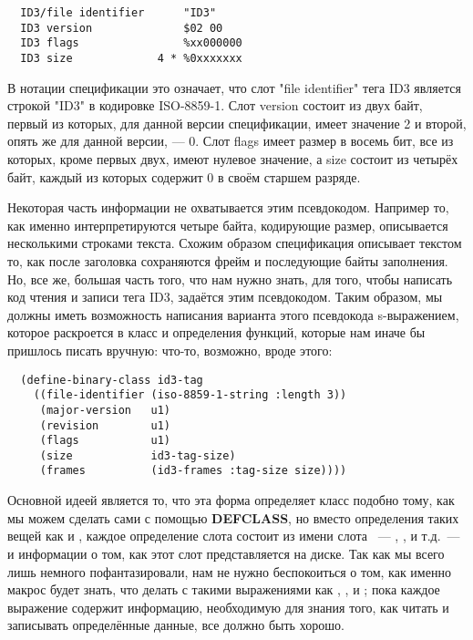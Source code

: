 \begin{verbatim}
  ID3/file identifier      "ID3"
  ID3 version              $02 00
  ID3 flags                %xx000000
  ID3 size             4 * %0xxxxxxx
\end{verbatim}

В нотации спецификации это означает, что слот "file identifier" тега ID3 является строкой
"ID3" в кодировке ISO-8859-1. Слот version состоит из двух байт, первый из которых, для
данной версии спецификации, имеет значение 2 и второй, опять же для данной версии, ---
0. Слот flags имеет размер в восемь бит, все из которых, кроме первых двух, имеют нулевое
значение, а size состоит из четырёх байт, каждый из которых содержит 0 в своём старшем
разряде.

Некоторая часть информации не охватывается этим псевдокодом. Например то, как именно
интерпретируются четыре байта, кодирующие размер, описывается несколькими строками
текста. Схожим образом спецификация описывает текстом то, как после заголовка сохраняются
фрейм и последующие байты заполнения. Но, все же, большая часть того, что нам нужно знать,
для того, чтобы написать код чтения и записи тега ID3, задаётся этим псевдокодом. Таким
образом, мы должны иметь возможность написания варианта этого псевдокода s-выражением,
которое раскроется в класс и определения функций, которые нам иначе бы пришлось писать
вручную: что-то, возможно, вроде этого:

\begin{lstlisting}
  (define-binary-class id3-tag
    ((file-identifier (iso-8859-1-string :length 3))
     (major-version   u1)
     (revision        u1)
     (flags           u1)
     (size            id3-tag-size)
     (frames          (id3-frames :tag-size size))))
\end{lstlisting}

Основной идеей является то, что эта форма определяет класс  подобно тому,
как мы можем сделать сами с помощью \textbf{DEFCLASS}, но вместо определения таких вещей
как  и , каждое определение слота состоит из имени слота
~--- , , и т.д.~--- и информации о том, как этот
слот представляется на диске. Так как мы всего лишь немного пофантазировали, нам не нужно
беспокоиться о том, как именно макрос  будет знать, что делать с
такими выражениями как , ,
 и ; пока каждое выражение содержит
информацию, необходимую для знания того, как читать и записывать определённые данные, все
должно быть хорошо.


